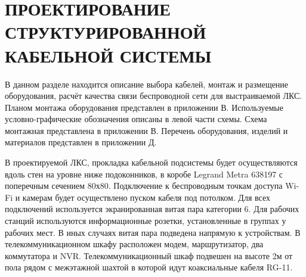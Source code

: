 \section{ПРОЕКТИРОВАНИЕ СТРУКТУРИРОВАННОЙ КАБЕЛЬНОЙ СИСТЕМЫ}
\label{sec:dev}

В данном разделе находится описание выбора кабелей, монтаж и размещение оборудования,
расчёт качества связи беспроводной сети для выстраиваемой ЛКС. Планом монтажа оборудования представлен в приложении В. 
Используемые условно-графические обозначения описаны в левой части схемы. Схема монтажная представлена в приложении В. 
Перечень оборудования, изделий и материалов представлен в приложении Д. 

В проектируемой ЛКС, прокладка кабельной подсистемы будет осуществляются вдоль стен на уровне ниже подоконников, в коробе 
Legrand Metra 638197
с поперечным сечением 80х80. 
Подключение к беспроводным точкам доступа Wi-Fi и камерам будет осуществлено пуском кабеля под потолком. 
Для всех подключений используется экранированная витая пара категории 6. 
Для рабочих станций используются информационные розетки, установленные в группах у рабочих мест. 
В иных случаях витая пара подведена напрямую к устройствам. 
В телекоммуникационном шкафу расположен модем, маршрутизатор, два коммутатора и NVR. Телекоммуникационный шкаф подвешен 
на высоте 2м от пола рядом с межэтажной шахтой в которой идут коаксиальные кабеля RG-11.